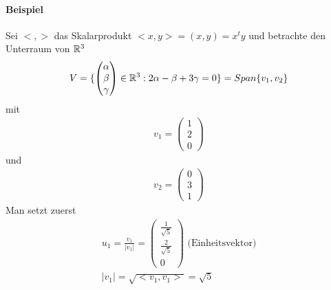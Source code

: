 \paragraph{Beispiel}
Sei $<, >$ das Skalarprodukt $<x, y> = (x, y) = x^t y$ und betrachte den Unterraum von $\mathbb{R}^3$
\begin{align}
V = \{ \begin{pmatrix} \alpha \\ \beta \\ \gamma \end{pmatrix} \in \mathbb{R}^3: 2 \alpha - \beta + 3 \gamma = 0 \} = Span \{v_1, v_2\}
\end{align}
mit
\begin{align}
v_1 = \begin{pmatrix} 1 \\ 2 \\ 0 \end{pmatrix}
\end{align}
und
\begin{align}
v_2 = \begin{pmatrix} 0 \\ 3 \\ 1 \end{pmatrix}
\end{align}
Man setzt zuerst 
\begin{align}
u_1 = \frac{v_1}{|v_1|} = \begin{pmatrix} \frac{1}{\sqrt{5}} \\ \frac{2}{\sqrt{5}} \\ 0 \end{pmatrix} \text{ (Einheitsvektor)} \\
|v_1| = \sqrt{<v_1, v_1>} = \sqrt{5}
\end{align}

